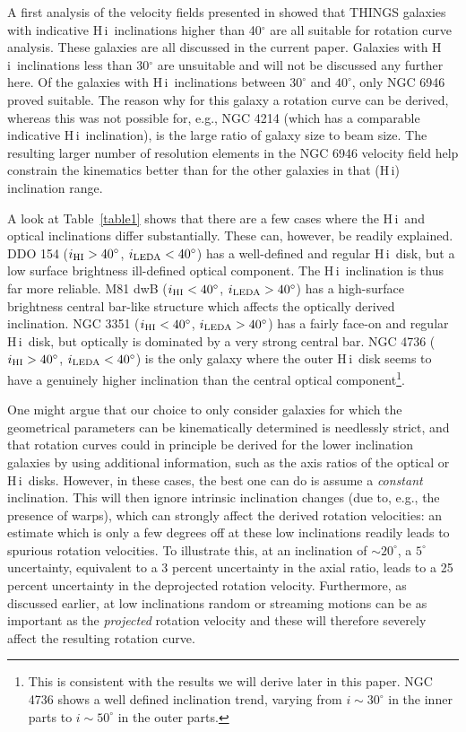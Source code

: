 \documentclass[usenatbib,usegraphicx,apjfonts,floatfix]{emulateapj}
\newcommand{\HI}{H\,{\sc i}}
\newcommand{\degree}{\ensuremath{^{\circ}}}
\begin{document}
A first analysis of the velocity fields presented in \citet{THINGS1}
showed that THINGS galaxies with indicative \HI\ inclinations higher
than 40$^{\circ}$ are all suitable for rotation curve analysis. These
galaxies are all discussed in the current paper. Galaxies with
\HI\ inclinations less than 30$^{\circ}$ are unsuitable and will not
be discussed any further here.  Of the galaxies with \HI\ inclinations
between $30^{\circ}$ and $40^{\circ}$, only NGC 6946 proved suitable.
The reason why for this galaxy a rotation curve can be derived,
whereas this was not possible for, e.g., NGC 4214 (which has a
comparable indicative \HI\ inclination), is the large ratio of galaxy
size to beam size.  The resulting larger number of resolution elements
in the NGC 6946 velocity field help constrain the kinematics better
than for the other galaxies in that (\HI) inclination range.

A look at Table~\ref{table1} shows that there are a few cases where
the \HI\ and optical inclinations differ substantially.  These can,
however, be readily explained.  DDO 154 ($i_{\rm HI}> 40\degree$,
$i_{\rm LEDA} < 40\degree$) has a well-defined and regular \HI\ disk,
but a low surface brightness ill-defined optical component. The
\HI\ inclination is thus far more reliable.  M81 dwB ($i_{\rm HI}<
40\degree$, $i_{\rm LEDA} > 40\degree$) has a high-surface brightness
central bar-like structure which affects the optically derived
inclination.  NGC 3351 ($i_{\rm HI}< 40\degree$, $i_{\rm LEDA} >
40\degree$) has a fairly face-on and regular \HI\ disk, but optically
is dominated by a very strong central bar.  NGC 4736 ($i_{\rm HI}>
40\degree$, $i_{\rm LEDA} < 40\degree$) is the only galaxy where the
outer \HI\ disk seems to have a genuinely higher inclination than the
central optical component\footnote{This is consistent with the results
  we will derive later in this paper. NGC 4736 shows a well defined
  inclination trend, varying from $i \sim 30^{\circ}$ in the inner
  parts to $i \sim 50^{\circ}$ in the outer parts.}.

One might argue that our choice to only consider galaxies for which
the geometrical parameters can be kinematically determined is
needlessly strict, and that rotation curves could in principle be
derived for the lower inclination galaxies by using additional
information, such as the axis ratios of the optical or \HI\ disks.
However, in these cases, the best one can do is assume a
\emph{constant} inclination.  This will then ignore intrinsic
inclination changes (due to, e.g., the presence of warps), which can
strongly affect the derived rotation velocities: an estimate which is
only a few degrees off at these low inclinations readily leads to
spurious rotation velocities. To illustrate this, at an inclination of
$ \sim 20^{\circ}$, a $5^{\circ}$ uncertainty, equivalent to a 3
percent uncertainty in the axial ratio, leads to a 25 percent
uncertainty in the deprojected rotation velocity.  Furthermore, as
discussed earlier, at low inclinations random or streaming motions can
be as important as the \emph{projected} rotation velocity and these will
therefore severely affect the resulting rotation curve.
\end{document}
